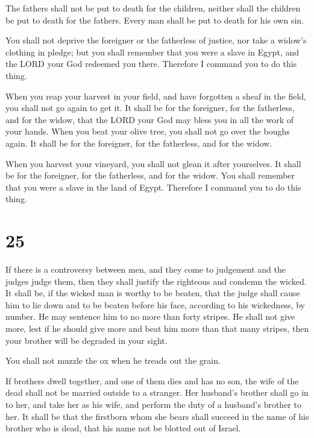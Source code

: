  The fathers shall not be put to death for the children,
neither shall the children be put to death for the fathers. Every man
shall be put to death for his own sin.

 You shall not deprive the foreigner or the fatherless of
justice, nor take a widow's clothing in pledge;  but you
shall remember that you were a slave in Egypt, and the LORD your God
redeemed you there. Therefore I command you to do this thing.

 When you reap your harvest in your field, and have
forgotten a sheaf in the field, you shall not go again to get it. It
shall be for the foreigner, for the fatherless, and for the widow, that
the LORD your God may bless you in all the work of your hands.
 When you beat your olive tree, you shall not go over the
boughs again. It shall be for the foreigner, for the fatherless, and for
the widow.

 When you harvest your vineyard, you shall not glean it
after yourselves. It shall be for the foreigner, for the fatherless, and
for the widow.  You shall remember that you were a slave in
the land of Egypt. Therefore I command you to do this thing.

\hypertarget{section-24}{%
\section{25}\label{section-24}}

 If there is a controversy between men, and they come to
judgement and the judges judge them, then they shall justify the
righteous and condemn the wicked.  It shall be, if the
wicked man is worthy to be beaten, that the judge shall cause him to lie
down and to be beaten before his face, according to his wickedness, by
number.  He may sentence him to no more than forty stripes.
He shall not give more, lest if he should give more and beat him more
than that many stripes, then your brother will be degraded in your
sight.

 You shall not muzzle the ox when he treads out the grain.

 If brothers dwell together, and one of them dies and has no
son, the wife of the dead shall not be married outside to a stranger.
Her husband's brother shall go in to her, and take her as his wife, and
perform the duty of a husband's brother to her.  It shall be
that the firstborn whom she bears shall succeed in the name of his
brother who is dead, that his name not be blotted out of Israel.

